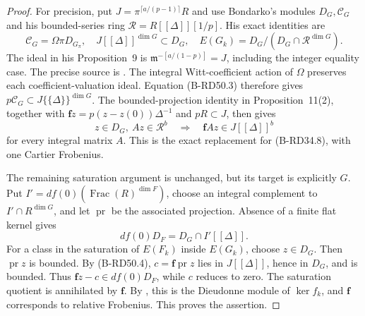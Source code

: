 \begin{proof}
For precision, put $J=\pi^{\lceil a/(p-1)\rceil}R$ and use
Bondarko's modules $D_G,\mathcal C_G$ and his bounded-series ring
$\mathcal R=R[[\Delta]][1/p]$. His exact identities are
\[
 \mathcal C_G=\Omega\pi D_{G_\pi},\quad
 J[[\Delta]]^{\dim G}\subset D_G,\quad
 E(G_k)=D_G/(D_G\cap\mathcal R^{\dim G}).
\]
The ideal in his Proposition~9 is
$\mathfrak m^{-[a/(1-p)]}=J$, including the integer equality
case. The precise source is
\cite[Propositions~9--12 and Lemma~3, pp.~674--676;
Proposition~16 and its full proof, p.~681]{Bondarko2006Generic}.
The integral Witt-coefficient action of $\Omega$ preserves each
coefficient-valuation ideal. Equation (B-RD50.3) therefore gives
$p\mathcal C_G\subset J\{\{\Delta\}\}^{\dim G}$.
The bounded-projection identity in Proposition~11(2), together
with $\mathbf fz=p(z-z(0))\Delta^{-1}$ and $pR\subset J$,
then gives
\[
 z\in D_G,\ Az\in\mathcal R^b
       \quad\Longrightarrow\quad
                 \mathbf fAz\in J[[\Delta]]^b
                                                        \tag{B-RD50.4}
\]
for every integral matrix $A$. This is the exact replacement
for (B-RD34.8), with one Cartier Frobenius.

The remaining saturation argument is unchanged, but its target
is explicitly $G$. Put $I'=df(0)(\operatorname{Frac}(R)^{\dim F})$,
choose an integral complement to $I'\cap R^{\dim G}$, and let
$\operatorname{pr}$ be the associated projection. Absence of a
finite flat kernel gives
\[
 df(0)D_F=D_G\cap I'[[\Delta]].
\]
For a class in the saturation of $E(F_k)$ inside $E(G_k)$,
choose $z\in D_G$. Then $\operatorname{pr}z$ is bounded.
By (B-RD50.4), $c=\mathbf f\operatorname{pr}z$ lies in
$J[[\Delta]]$, hence in $D_G$, and is bounded. Thus
$\mathbf fz-c\in df(0)D_F$, while $c$ reduces to zero.
The saturation quotient is annihilated by $\mathbf f$.
By \cite[Theorem~2(8), equation~(6), p.~668]{Bondarko2006Generic},
this is the Dieudonne module of $\ker f_k$, and $\mathbf f$
corresponds to relative Frobenius. This proves the assertion.
\end{proof}

